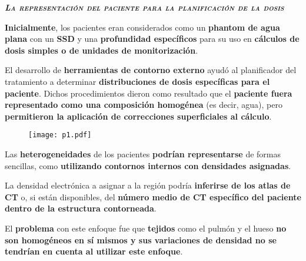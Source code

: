 \documentclass[aspectratio=169,xcolor=dvipsnames,t]{beamer}
\begin{document}

\begin{frame}[standout]
      \centering\LARGE
      \textbf{\itshape\scshape La representación del paciente para la planificación de la dosis}
\end{frame}

\begin{frame}

    \textbf{Inicialmente}, los pacientes eran considerados como un \textbf{phantom de agua plana} con un \textbf{SSD} y una \textbf{profundidad específicos} para su uso en \textbf{cálculos de dosis simples o de unidades de monitorización}.

    El desarrollo de \textbf{herramientas de contorno externo} ayudó al planificador del tratamiento a determinar \textbf{distribuciones de dosis específicas para el paciente}. Dichos procedimientos dieron como resultado que el \textbf{paciente fuera representado como una composición homogénea} (es decir, agua), pero \textbf{permitieron la aplicación de correcciones superficiales al cálculo}.

    \begin{figure}[h]
        \centering
        \texttt{[image: p1.pdf]}
    \end{figure}

\end{frame}

\begin{frame}

    Las \textbf{heterogeneidades} de los pacientes \textbf{podrían representarse} de formas sencillas, como \textbf{utilizando contornos internos con densidades asignadas}.

    La densidad electrónica a asignar a la región podría \textbf{inferirse de los atlas de CT} o, si están disponibles, del \textbf{número medio de CT específico del paciente dentro de la estructura contorneada}.

    El \textbf{problema} con este enfoque fue que \textbf{tejidos} como el pulmón y el hueso \textbf{no son homogéneos en sí mismos y sus variaciones de densidad no se tendrían en cuenta al utilizar este enfoque}.

\end{frame}
\end{document}
